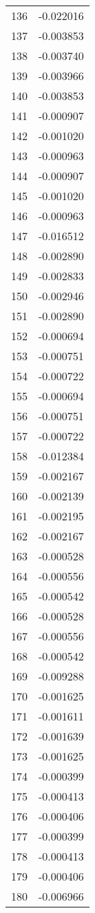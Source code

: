 \documentclass[12pt]{article}
\begin{document}
\begin{longtable}{@{}cc@{}}
136 & -0.022016 \\
137 & -0.003853 \\
138 & -0.003740 \\
139 & -0.003966 \\
140 & -0.003853 \\
141 & -0.000907 \\
142 & -0.001020 \\
143 & -0.000963 \\
144 & -0.000907 \\
145 & -0.001020 \\
146 & -0.000963 \\
147 & -0.016512 \\
148 & -0.002890 \\
149 & -0.002833 \\
150 & -0.002946 \\
151 & -0.002890 \\
152 & -0.000694 \\
153 & -0.000751 \\
154 & -0.000722 \\
155 & -0.000694 \\
156 & -0.000751 \\
157 & -0.000722 \\
158 & -0.012384 \\
159 & -0.002167 \\
160 & -0.002139 \\
161 & -0.002195 \\
162 & -0.002167 \\
163 & -0.000528 \\
164 & -0.000556 \\
165 & -0.000542 \\
166 & -0.000528 \\
167 & -0.000556 \\
168 & -0.000542 \\
169 & -0.009288 \\
170 & -0.001625 \\
171 & -0.001611 \\
172 & -0.001639 \\
173 & -0.001625 \\
174 & -0.000399 \\
175 & -0.000413 \\
176 & -0.000406 \\
177 & -0.000399 \\
178 & -0.000413 \\
179 & -0.000406 \\
180 & -0.006966 \\

\end{longtable}
\end{document}

